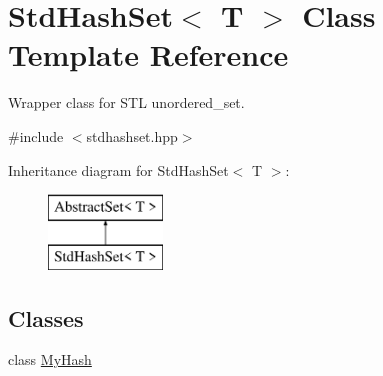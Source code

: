 \hypertarget{class_std_hash_set}{\section{Std\-Hash\-Set$<$ T $>$ Class Template Reference}
\label{class_std_hash_set}
}


Wrapper class for S\-T\-L unordered\-\_\-set.  




{\ttfamily \#include $<$stdhashset.\-hpp$>$}

Inheritance diagram for Std\-Hash\-Set$<$ T $>$\-:\begin{figure}[H]
\begin{center}
\leavevmode
\includegraphics[height=2.000000cm]{class_std_hash_set}
\end{center}
\end{figure}
\subsection*{Classes}
\begin{DoxyCompactItemize}
\item 
class \hyperlink{class_std_hash_set_1_1_my_hash}{My\-Hash}
\end{DoxyCompactItemize}
